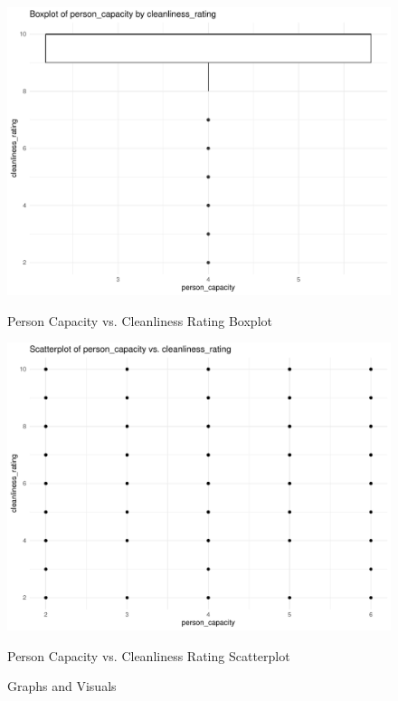 \documentclass[12pt, letterpaper]{article}
\begin{document}
\begin{figure}[H]
  \vspace{0.05\textwidth}

  \begin{minipage}{0.45\textwidth}
    \includegraphics[width=\linewidth]{person_capacity_cleanliness_rating__boxplot.pdf}
    \caption{Person Capacity vs. Cleanliness Rating Boxplot}
    \label{fig:person_capacity_cleanliness_rating__boxplot}
  \end{minipage}
  \hspace{0.05\textwidth}
  \begin{minipage}{0.45\textwidth}
    \includegraphics[width=\linewidth]{person_capacity_cleanliness_rating__scatterplot.pdf}
    \caption{Person Capacity vs. Cleanliness Rating Scatterplot}
    \label{fig:person_capacity_cleanliness_rating__scatterplot}
  \end{minipage}

  \caption{Graphs and Visuals}
  \label{fig:additional_graphs}
\end{figure}
\end{document}
